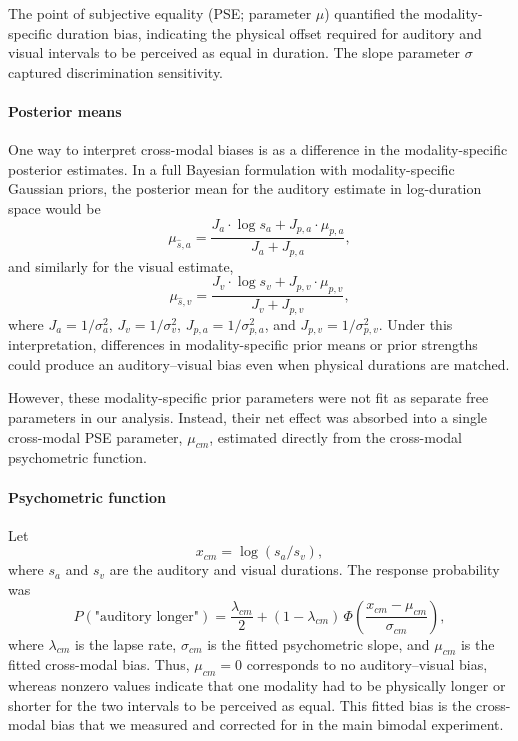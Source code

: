 \documentclass{jov}
\begin{document}
The point of subjective equality (PSE; parameter $\mu$) quantified the modality-specific duration bias, indicating the physical offset required for auditory and visual intervals to be perceived as equal in duration. The slope parameter $\sigma$ captured discrimination sensitivity.


\paragraph{Posterior means}
One way to interpret cross-modal biases is as a difference in the modality-specific posterior estimates. In a full Bayesian formulation with modality-specific Gaussian priors, the posterior mean for the auditory estimate in log-duration space would be
\begin{equation}
\mu_{\hat{s},a} = \frac{J_a \cdot \log s_a + J_{p,a} \cdot \mu_{p,a}}{J_a + J_{p,a}},
\end{equation}
and similarly for the visual estimate,
\begin{equation}
\mu_{\hat{s},v} = \frac{J_v \cdot \log s_v + J_{p,v} \cdot \mu_{p,v}}{J_v + J_{p,v}},
\end{equation}
where $J_a = 1/\sigma_a^2$, $J_v = 1/\sigma_v^2$, $J_{p,a}=1/\sigma_{p,a}^2$, and $J_{p,v}=1/\sigma_{p,v}^2$. Under this interpretation, differences in modality-specific prior means or prior strengths could produce an auditory--visual bias even when physical durations are matched.

However, these modality-specific prior parameters were not fit as separate free parameters in our analysis. Instead, their net effect was absorbed into a single cross-modal PSE parameter, $\mu_{cm}$, estimated directly from the cross-modal psychometric function.

\paragraph{Psychometric function}
Let
\begin{equation}
x_{cm} = \log(s_a/s_v),
\end{equation}
where $s_a$ and $s_v$ are the auditory and visual durations. The response probability was
\begin{equation}
P(\text{"auditory longer"})
=
\frac{\lambda_{cm}}{2}
+ (1-\lambda_{cm})\,
\Phi\left(
\frac{x_{cm}-\mu_{cm}}{\sigma_{cm}}
\right),
\end{equation}
where $\lambda_{cm}$ is the lapse rate, $\sigma_{cm}$ is the fitted psychometric slope, and $\mu_{cm}$ is the fitted cross-modal bias. Thus, $\mu_{cm}=0$ corresponds to no auditory--visual bias, whereas nonzero values indicate that one modality had to be physically longer or shorter for the two intervals to be perceived as equal. This fitted bias is the cross-modal bias that we measured and corrected for in the main bimodal experiment.
\end{document}
